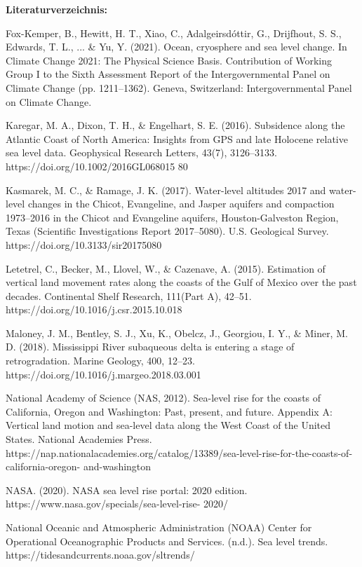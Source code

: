 \documentclass[12pt,paper=a4,DIV=12,parskip=never,chapterprefix=false,headings=standardclasses]{scrreprt}
\begin{document}
\vfill
\noindent\textbf{Literaturverzeichnis:}

\begingroup
\parindent=0pt
\everypar{\hangindent=2em\hangafter=1\relax}

Fox-Kemper, B., Hewitt, H. T., Xiao, C., Adalgeirsdóttir, G., Drijfhout, S. S., Edwards, T. L., ... \& Yu, Y.
(2021). Ocean, cryosphere and sea level change. In Climate Change 2021: The Physical Science
Basis. Contribution of Working Group I to the Sixth Assessment Report of the Intergovernmental
Panel on Climate Change (pp. 1211–1362). Geneva, Switzerland: Intergovernmental Panel on
Climate Change.

Karegar, M. A., Dixon, T. H., \& Engelhart, S. E. (2016). Subsidence along the Atlantic Coast of North
America: Insights from GPS and late Holocene relative sea level data. Geophysical Research Letters,
43(7), 3126–3133. https://doi.org/10.1002/2016GL068015
80

Kasmarek, M. C., \& Ramage, J. K. (2017). Water-level altitudes 2017 and water-level changes in the
Chicot, Evangeline, and Jasper aquifers and compaction 1973–2016 in the Chicot and Evangeline
aquifers, Houston-Galveston Region, Texas (Scientific Investigations Report 2017–5080). U.S.
Geological Survey. https://doi.org/10.3133/sir20175080

Letetrel, C., Becker, M., Llovel, W., \& Cazenave, A. (2015). Estimation of vertical land movement rates
along the coasts of the Gulf of Mexico over the past decades. Continental Shelf Research, 111(Part
A), 42–51. https://doi.org/10.1016/j.csr.2015.10.018

Maloney, J. M., Bentley, S. J., Xu, K., Obelcz, J., Georgiou, I. Y., \& Miner, M. D. (2018). Mississippi
River subaqueous delta is entering a stage of retrogradation. Marine Geology, 400, 12–23.
https://doi.org/10.1016/j.margeo.2018.03.001

National Academy of Science (NAS, 2012). Sea-level rise for the coasts of California, Oregon and
Washington: Past, present, and future. Appendix A: Vertical land motion and sea-level data along the
West Coast of the United States. National Academies Press.
https://nap.nationalacademies.org/catalog/13389/sea-level-rise-for-the-coasts-of-california-oregon-
and-washington

NASA. (2020). NASA sea level rise portal: 2020 edition. https://www.nasa.gov/specials/sea-level-rise-
2020/

National Oceanic and Atmospheric Administration (NOAA) Center for Operational Oceanographic
Products and Services. (n.d.). Sea level trends. https://tidesandcurrents.noaa.gov/sltrends/
\end{document}
